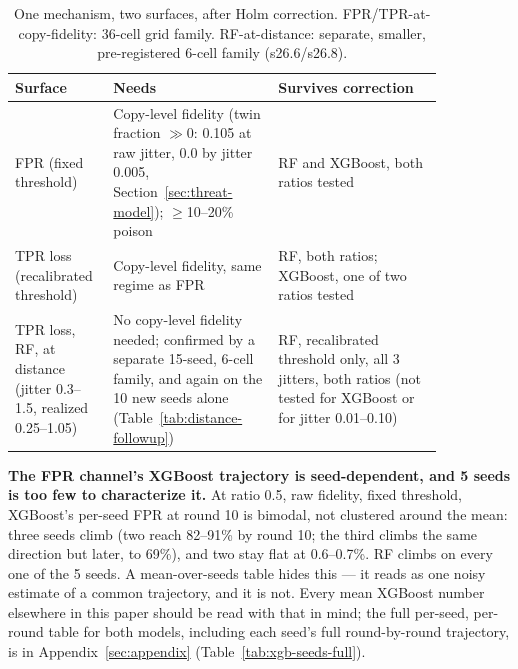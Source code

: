 \begin{table}[t]
  \centering
  \caption{One mechanism, two surfaces, after Holm correction. FPR/TPR-at-copy-fidelity: 36-cell
  grid family. RF-at-distance: separate, smaller, pre-registered 6-cell family (s26.6/s26.8).}
  \label{tab:two-channels}
  \small
  \setlength{\tabcolsep}{4pt}
  \begin{tabular}{p{0.15\linewidth}p{0.35\linewidth}p{0.35\linewidth}}
    \toprule
    Surface & Needs & Survives correction \\
    \midrule
    FPR (fixed threshold)  & Copy-level fidelity (twin fraction $\gg0$: 0.105 at raw jitter, 0.0 by jitter 0.005, Section~\ref{sec:threat-model}); $\ge$10--20\% poison & RF and XGBoost, both ratios tested \\
    TPR loss (recalibrated threshold) & Copy-level fidelity, same regime as FPR & RF, both ratios; XGBoost, one of two ratios tested \\
    TPR loss, RF, at distance (jitter 0.3--1.5, realized 0.25--1.05) & No copy-level fidelity needed; confirmed by a separate 15-seed, 6-cell family, and again on the 10 new seeds alone (Table~\ref{tab:distance-followup}) & RF, recalibrated threshold only, all 3 jitters, both ratios (not tested for XGBoost or for jitter 0.01--0.10) \\
    \bottomrule
  \end{tabular}
\end{table}

\textbf{The FPR channel's XGBoost trajectory is seed-dependent, and 5 seeds is too few to
characterize it.} At ratio 0.5, raw fidelity, fixed threshold, XGBoost's per-seed FPR at round
10 is bimodal, not clustered around the mean: three seeds climb (two reach 82--91\% by round
10; the third climbs the same direction but later, to 69\%), and two stay flat at 0.6--0.7\%. RF
climbs on every one of the 5 seeds. A mean-over-seeds table hides this — it reads as one noisy
estimate of a common trajectory, and it is not. Every mean XGBoost number elsewhere in this
paper should be read with that in mind; the full per-seed, per-round table for both models,
including each seed's full round-by-round trajectory, is in Appendix~\ref{sec:appendix}
(Table~\ref{tab:xgb-seeds-full}).

